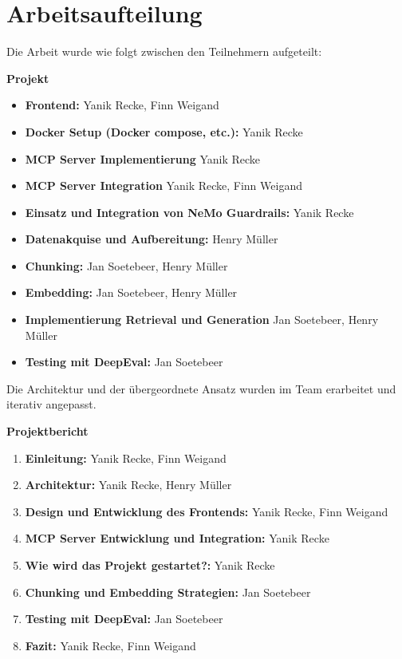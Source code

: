\chapter{Arbeitsaufteilung}

Die Arbeit wurde wie folgt zwischen den Teilnehmern aufgeteilt:

\textbf{Projekt}
\begin{itemize}
    \item \textbf{Frontend:} Yanik Recke, Finn Weigand
    \item \textbf{Docker Setup (Docker compose, etc.):} Yanik Recke
    \item \textbf{MCP Server Implementierung} Yanik Recke
    \item \textbf{MCP Server Integration} Yanik Recke, Finn Weigand
    \item \textbf{Einsatz und Integration von NeMo Guardrails:} Yanik Recke
    \item \textbf{Datenakquise und Aufbereitung:} Henry Müller
    \item \textbf{Chunking:} Jan Soetebeer, Henry Müller
    \item \textbf{Embedding:} Jan Soetebeer, Henry Müller
    \item \textbf{Implementierung Retrieval und Generation} Jan Soetebeer, Henry Müller
    \item \textbf{Testing mit DeepEval:} Jan Soetebeer
 \end{itemize}

 Die Architektur und der übergeordnete Ansatz wurden im Team erarbeitet und iterativ angepasst.


\textbf{Projektbericht}
\begin{enumerate}
    \item \textbf{Einleitung:} Yanik Recke, Finn Weigand
    \item \textbf{Architektur:} Yanik Recke, Henry Müller
    \item \textbf{Design und Entwicklung des Frontends:} Yanik Recke, Finn Weigand
    \item \textbf{MCP Server Entwicklung und Integration:} Yanik Recke
    \item \textbf{Wie wird das Projekt gestartet?:} Yanik Recke
    \item \textbf{Chunking und Embedding Strategien:} Jan Soetebeer
    \item \textbf{Testing mit DeepEval:} Jan Soetebeer
    \item \textbf{Fazit:} Yanik Recke, Finn Weigand
\end{enumerate}
